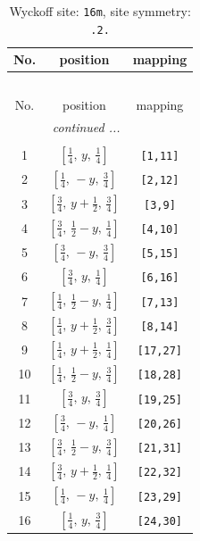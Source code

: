 \documentclass[fleqn,8pt]{jsarticle}
\begin{document}
\begin{longtable}{ccc}
\caption{Wyckoff site: {\tt 16m}, site symmetry: {\tt .2.}}
 \\
 \hline \hline
No. & position & mapping \\ \hline \endfirsthead

\multicolumn{2}{l}{\tablename\ \thetable{}} \\
 \hline \hline
No. & position & mapping \\ \hline \endhead

 \hline \hline
\multicolumn{2}{r}{\footnotesize\it continued ...} \\ \endfoot

 \hline \hline
\multicolumn{2}{r}{} \\ \endlastfoot

1 & $\left[ \frac{1}{4},\, y,\, \frac{1}{4} \right]$ & {\tt [1,11]} \\ \hline
2 & $\left[ \frac{1}{4},\, - y,\, \frac{3}{4} \right]$ & {\tt [2,12]} \\ \hline
3 & $\left[ \frac{3}{4},\, y + \frac{1}{2},\, \frac{3}{4} \right]$ & {\tt [3,9]} \\ \hline
4 & $\left[ \frac{3}{4},\, \frac{1}{2} - y,\, \frac{1}{4} \right]$ & {\tt [4,10]} \\ \hline
5 & $\left[ \frac{3}{4},\, - y,\, \frac{3}{4} \right]$ & {\tt [5,15]} \\ \hline
6 & $\left[ \frac{3}{4},\, y,\, \frac{1}{4} \right]$ & {\tt [6,16]} \\ \hline
7 & $\left[ \frac{1}{4},\, \frac{1}{2} - y,\, \frac{1}{4} \right]$ & {\tt [7,13]} \\ \hline
8 & $\left[ \frac{1}{4},\, y + \frac{1}{2},\, \frac{3}{4} \right]$ & {\tt [8,14]} \\ \hline
9 & $\left[ \frac{1}{4},\, y + \frac{1}{2},\, \frac{1}{4} \right]$ & {\tt [17,27]} \\ \hline
10 & $\left[ \frac{1}{4},\, \frac{1}{2} - y,\, \frac{3}{4} \right]$ & {\tt [18,28]} \\ \hline
11 & $\left[ \frac{3}{4},\, y,\, \frac{3}{4} \right]$ & {\tt [19,25]} \\ \hline
12 & $\left[ \frac{3}{4},\, - y,\, \frac{1}{4} \right]$ & {\tt [20,26]} \\ \hline
13 & $\left[ \frac{3}{4},\, \frac{1}{2} - y,\, \frac{3}{4} \right]$ & {\tt [21,31]} \\ \hline
14 & $\left[ \frac{3}{4},\, y + \frac{1}{2},\, \frac{1}{4} \right]$ & {\tt [22,32]} \\ \hline
15 & $\left[ \frac{1}{4},\, - y,\, \frac{1}{4} \right]$ & {\tt [23,29]} \\ \hline
16 & $\left[ \frac{1}{4},\, y,\, \frac{3}{4} \right]$ & {\tt [24,30]} \\
\end{longtable}
\end{document}
